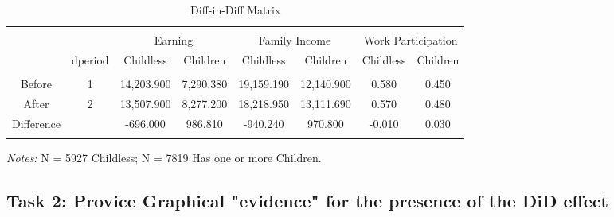 \documentclass[a4paper]{article}
\begin{document}
\begin{table}[!htbp] 
\begin{adjustwidth}{-0cm}{-0cm}
\begin{threeparttable}
\small
\captionsetup{font=small, justification=raggedright,singlelinecheck=false}
  \caption{Diff-in-Diff Matrix} 
  \label{} 
\begin{tabular}{@{\extracolsep{8pt}}lccccccc} 
\\[-5.8ex]\hline 
\hline \\[-1.8ex]
\multicolumn{2}{c}{}  & \multicolumn{2}{c}{Earning}  & \multicolumn{2}{c}{Family Income} & \multicolumn{2}{c}{Work Participation} \\ 
\multicolumn{1}{c}{} & \multicolumn{1}{c}{dperiod} & \multicolumn{1}{c}{Childless} & \multicolumn{1}{c}{Children} & \multicolumn{1}{c}{Childless} & \multicolumn{1}{c}{Children} & \multicolumn{1}{c}{Childless} & \multicolumn{1}{c}{Children} \\ 
\hline \\[-1.8ex] 
\multicolumn{1}{c}{Before} & 1 & 14,203.900 & 7,290.380 & 19,159.190 & 12,140.900 & 0.580 & 0.450 \\ 
\multicolumn{1}{c}{After} & 2 & 13,507.900 & 8,277.200 & 18,218.950 & 13,111.690 & 0.570 & 0.480 \\ 
\multicolumn{1}{c}{Difference} &  & -696.000 & 986.810 & -940.240 & 970.800 & -0.010 & 0.030 \\ 
\hline \\[-3.6ex] 
\end{tabular} 
\begin{tablenotes}
      \small
      \item\textit{Notes:} N = 5927 Childless; N = 7819 Has one or more Children.
    \end{tablenotes}
\end{threeparttable}
\end{adjustwidth}
\end{table}

\subsection{Task 2: Provice Graphical "evidence" for the presence of the DiD effect}
\end{document}

